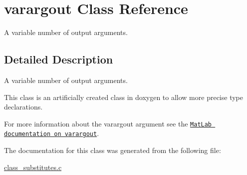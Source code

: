 \hypertarget{classvarargout}{\section{varargout Class Reference}
\label{classvarargout}
}


A variable number of output arguments.  




\subsection{Detailed Description}
A variable number of output arguments. 

This class is an artificially created class in doxygen to allow more precise type declarations.

For more information about the varargout argument see the \href{http://www.mathworks.de/help/techdoc/ref/varargout.html}{\tt Mat\-Lab documentation on varargout}. 

The documentation for this class was generated from the following file\-:\begin{DoxyCompactItemize}
\item 
\hyperlink{class__substitutes_8c}{class\-\_\-substitutes.\-c}\end{DoxyCompactItemize}
